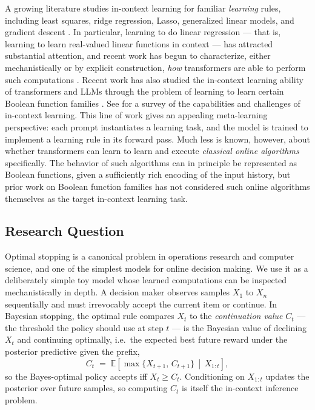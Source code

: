 \documentclass[11pt]{article}
\begin{document}
A growing literature studies in-context learning for familiar \emph{learning} rules, including least squares, ridge regression, Lasso, generalized linear models, and gradient descent \cite{akyurekWhatLearningAlgorithm2023,baiTransformersStatisticiansProvable2023,gargWhatCanTransformers2022}. In particular, learning to do linear regression --- that is, learning to learn real-valued linear functions in context --- has attracted substantial attention, and recent work has begun to characterize, either mechanistically or by explicit construction, \emph{how} transformers are able to perform such computations \cite{akyurekWhatLearningAlgorithm2023,baiTransformersStatisticiansProvable2023}. Recent work has also studied the in-context learning ability of transformers and LLMs through the problem of learning to learn certain Boolean function families \cite{bhattamishraUnderstandingInContextLearning2023}. See \cite{dongSurveyIncontextLearning2024} for a survey of the capabilities and challenges of in-context learning. This line of work gives an appealing meta-learning perspective: each prompt instantiates a learning task, and the model is trained to implement a learning rule in its forward pass.
Much less is known, however, about whether transformers can learn to learn and execute \emph{classical online algorithms} specifically. The behavior of such algorithms can in principle be represented as Boolean functions, given a sufficiently rich encoding of the input history, but prior work on Boolean function families \cite{bhattamishraUnderstandingInContextLearning2023} has not considered such online algorithms themselves as the target in-context learning task.

\subsection{Research Question}

Optimal stopping is a canonical problem in operations research and computer science, and one of the simplest models for online decision making. We use it as a deliberately simple toy model whose learned computations can be inspected mechanistically in depth. A decision maker observes samples $X_1$ to $X_n$ sequentially and must irrevocably accept the current item or continue. In Bayesian stopping, the optimal rule compares \(X_t\) to the \emph{continuation value} \(C_t\) --- the threshold the policy should use at step \(t\) --- is the Bayesian value of declining \(X_t\) and continuing optimally, i.e.\ the expected best future reward under the posterior predictive given the prefix,
\[
C_t \;=\; \mathbb{E}\!\left[\max\{X_{t+1},\,C_{t+1}\}\,\middle|\,X_{1:t}\right],
\]
so the Bayes-optimal policy accepts iff \(X_t \ge C_t\). Conditioning on \(X_{1:t}\) updates the posterior over future samples, so computing \(C_t\) is itself the in-context inference problem.
\end{document}
